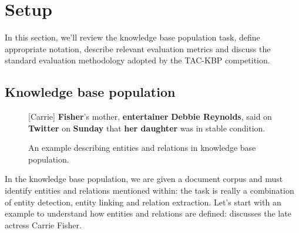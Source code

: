\section{Setup}
\label{sec:setup}
In this section, we'll review the knowledge base population task, define appropriate notation, describe relevant evaluation metrics and discuss the standard evaluation methodology adopted by the TAC-KBP competition.

\subsection{Knowledge base population}


\begin{figure}[t]
  \centering
    [Carrie] \textbf{Fisher}’s mother, \textbf{entertainer} \textbf{Debbie Reynolds}, said on \textbf{Twitter} on \textbf{Sunday} that \textbf{her daughter} was in stable condition.
%  
\caption{\label{fig:example} An example describing entities and relations in knowledge base population.}
\end{figure}

In the knowledge base population,
 we are given a document corpus and must identify entities and relations mentioned within:
 the task is really a combination of entity detection, entity linking and relation extraction. 
Let's start with an example to understand how entities and relations are defined:  discusses the late actress Carrie Fisher.

